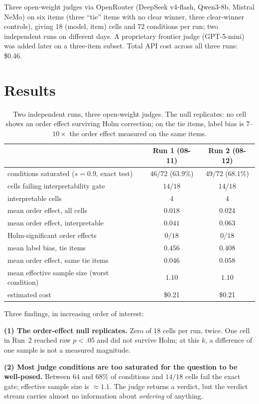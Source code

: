 \documentclass[11pt]{article}
\begin{document}
Three open-weight judges via OpenRouter (DeepSeek v4-flash, Qwen3-8b,
Mistral NeMo) on six items (three ``tie'' items with no clear winner, three
clear-winner controls), giving $18$ (model, item) cells and $72$ conditions
per run; two independent runs on different days. A proprietary frontier
judge (GPT-5-mini) was added later on a three-item subset. Total API cost
across all three runs: \$0.46.

\section{Results}

\begin{table}[h]
\centering
\small
\begin{tabular}{lcc}
\toprule
 & Run 1 (08-11) & Run 2 (08-12) \\
\midrule
conditions saturated ($s{=}0.9$, exact test) & $46/72$ ($63.9\%$) & $49/72$ ($68.1\%$) \\
cells failing interpretability gate & $14/18$ & $14/18$ \\
interpretable cells & $4$ & $4$ \\
mean order effect, all cells & $0.018$ & $0.024$ \\
mean order effect, interpretable & $0.041$ & $0.063$ \\
Holm-significant order effects & $0/18$ & $0/18$ \\
mean label bias, tie items & $0.456$ & $0.408$ \\
mean order effect, same tie items & $0.046$ & $0.058$ \\
mean effective sample size (worst condition) & $1.10$ & $1.10$ \\
estimated cost & \$0.21 & \$0.21 \\
\bottomrule
\end{tabular}
\caption{Two independent runs, three open-weight judges. The null replicates:
no cell shows an order effect surviving Holm correction; on the tie items,
label bias is $7$--$10\times$ the order effect measured on the same items.}
\end{table}

Three findings, in increasing order of interest:

\textbf{(1) The order-effect null replicates.} Zero of 18 cells per run,
twice. One cell in Run~2 reached raw $p < .05$ and did not survive Holm; at
this $k$, a difference of one sample is not a measured magnitude.

\textbf{(2) Most judge conditions are too saturated for the question to be
well-posed.} Between $64$ and $68\%$ of conditions and $14/18$ cells fail
the exact gate; effective sample size is ${\approx}1.1$. The judge returns a
verdict, but the verdict stream carries almost no information about
\emph{ordering} of anything.
\end{document}

